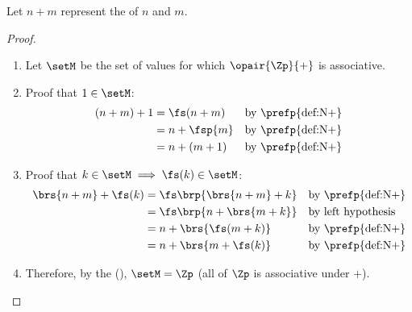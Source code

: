 \begin{theorem}
\label{thm:N+_assoc}
Let $n+m$ represent the  of $n$ and $m$.
\end{theorem}
\begin{proof}
    \begin{enumerate}
      \item Let $\setM$ be the set of values for which $\opair{\Zp}{+}$ is associative.
      \item Proof that $1\in\setM$:
        \begin{align*}
          (n+m)+1
            &= \fs(n+m)
            && \text{by \prefp{def:N+}}
          \\&= n + \fsp{m}
            && \text{by \prefp{def:N+}}
          \\&= n + (m+1)
            && \text{by \prefp{def:N+}}
        \end{align*}
      \item Proof that $k\in\setM\implies\fs(k)\in\setM$:
        \begin{align*}
          \brs{n+m} + \fs(k)
            &= \fs\brp{\brs{n+m} + k}
            && \text{by \prefp{def:N+}}
          \\&= \fs\brp{n+\brs{m + k}}
            && \text{by left hypothesis}
          \\&= n+\brs{\fs(m + k)}
            && \text{by \prefp{def:N+}}
          \\&= n + \brs{m + \fs(k)}
            && \text{by \prefp{def:N+}}
        \end{align*}

      \item Therefore, by the  (),
            $\setM=\Zp$ (all of $\Zp$ is associative under $+$).
    \end{enumerate}

\end{proof}


